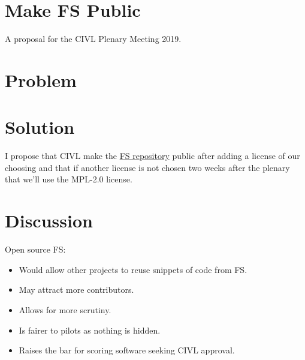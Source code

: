 \documentclass{article}
\begin{document}
\section*{Make FS Public}

A proposal for the CIVL Plenary Meeting 2019.

\section*{Problem}

\section*{Solution}
I propose that CIVL make the \href{https://github.com/FAI-CIVL/FS}{FS
repository} public after adding a license of our choosing and that if another
license is not chosen two weeks after the plenary that we'll use the MPL-2.0
license.

\section*{Discussion}
Open source FS:\\
\begin{itemize}
    \item Would allow other projects to reuse snippets of code from FS.
    \item May attract more contributors.
    \item Allows for more scrutiny.
    \item Is fairer to pilots as nothing is hidden.
    \item Raises the bar for scoring software seeking CIVL approval.
\end{itemize}
\end{document}

